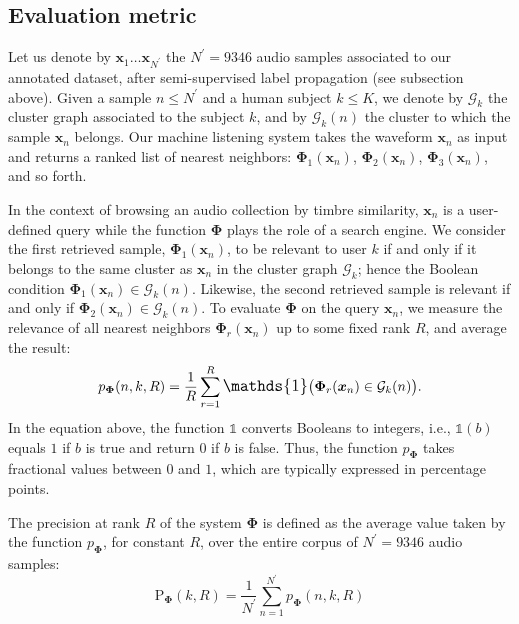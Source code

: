 \documentclass{bmcart}
\begin{document}
\subsection*{Evaluation metric}

Let us denote by $\boldsymbol{x}_1 \ldots \boldsymbol{x}_{{N}^{\prime}}$ the $N^{\prime}=9346$ audio samples associated to our annotated dataset, after semi-supervised label propagation (see subsection above).
Given a sample $n\leq N^{\prime}$ and a human subject $k\leq K$, we denote by $\mathcal{G}_k$ the cluster graph associated to the subject $k$, and by $\mathcal{G}_k (n)$ the cluster to which the sample $\boldsymbol{x}_{n}$ belongs.
Our machine listening system takes the waveform $\boldsymbol{x}_{n}$ as input and returns a ranked list of nearest neighbors: $\mathbf{\Phi}_1 (\boldsymbol{x}_n)$, $\mathbf{\Phi}_2 (\boldsymbol{x}_n)$, $\mathbf{\Phi}_3 (\boldsymbol{x}_n)$, and so forth.

In the context of browsing an audio collection by timbre similarity, $\boldsymbol{x}_n$ is a user-defined query while the function $\mathbf{\Phi}$ plays the role of a search engine.
We consider the first retrieved sample, $\mathbf{\Phi}_1 (\boldsymbol{x}_n)$, to be relevant to user $k$ if and only if it belongs to the same cluster as $\boldsymbol{x}_n$ in the cluster graph $\mathcal{G}_k$; hence the Boolean condition $\mathbf{\Phi}_{1}(\boldsymbol{x}_{n}) \in \mathcal{G}_k (n)$.
Likewise, the second retrieved sample is relevant if and only if $\mathbf{\Phi}_{2}(\boldsymbol{x}_{n}) \in \mathcal{G}_k (n)$.
To evaluate $\mathbf{\Phi}$ on the query $\boldsymbol{x}_n$, we measure the relevance of all nearest neighbors $\mathbf{\Phi}_r (\boldsymbol{x}_n)$ up to some fixed rank $R$, and average the result:
\begin{equation}
p_{\mathbf{\Phi}}(n, k, R) =
    \dfrac{1}{R}
    \sum_{r=1}^{R}
    \mathlarger{\mathds{1}}
    \big(
        \mathbf{\Phi}_r(\boldsymbol{x}_n)
        \in
        \mathcal{G}_k (n)
    \big).
\end{equation}
In the equation above, the function $\mathds{1}$ converts Booleans to integers, i.e., $\mathds{1}(b)$ equals $1$ if $b$ is true and return $0$ if $b$ is false.
Thus, the function $p_{\mathbf{\Phi}}$ takes fractional values between $0$ and $1$, which are typically expressed in percentage points.

The precision at rank $R$ of the system $\mathbf{\Phi}$ is defined as the average value taken by the function $p_{\mathbf{\Phi}}$, for constant $R$, over the entire corpus of $N^{\prime}=9346$ audio samples:
\begin{equation}
\mathrm{P}_{\mathbf{\Phi}}(k, R) =
\dfrac{1}{N^{\prime}}
\sum_{n=1}^{N^{\prime}}
p_{\mathbf{\Phi}}(n, k, R)
\end{equation}
\end{document}
